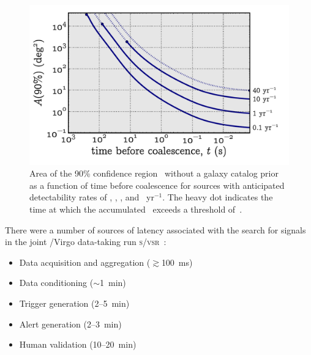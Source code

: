 \documentclass[portrait,plainboxedsections]{sciposter}
\begin{document}
\begin{minipage}[t]{0.25\textwidth}
\begin{figure}[h]
\includegraphics[width=1.15\textwidth]{figures/loc_in_time}
\caption{\label{fig:sky-localization-accuracy}Area of the 90\% confidence
region~\citep{Fairhurst2009} without a galaxy catalog prior as a function of time before coalescence for sources with anticipated
detectability rates of , , , and ~yr$^{-1}$. The heavy dot indicates
the time at which the accumulated \SNR\ exceeds a threshold of~.}
\end{figure}

There were a number of sources of latency associated with the search for
\CBC{} signals in the joint \LIGO{}/Virgo data-taking run \textsc{s}/\textsc{vsr}~\citep{HugheyGWPAW2011}:

\begin{itemize}
\item Data acquisition and aggregation ($\gtrsim$100~ms)

\item Data conditioning ($\sim$1~min)

\item Trigger generation (2--5~min)

\item Alert generation (2--3~min)

\item Human validation (10--20~min)

\end{itemize}

\end{minipage}%
\hspace{0.05\textwidth}%
\end{document}
